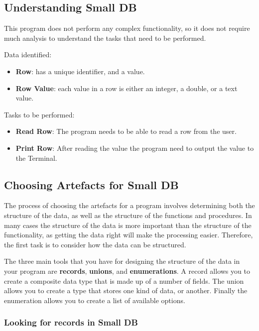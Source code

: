 \subsection{Understanding Small DB} %
\label{sub:understanding_small_db}

This program does not perform any complex functionality, so it does not require much analysis to understand the tasks that need to be performed.

Data identified:
\begin{itemize}
  \item \textbf{Row}: has a unique identifier, and a value.
  \item \textbf{Row Value}: each value in a row is either an integer, a double, or a text value.
\end{itemize}

Tasks to be performed:
\begin{itemize}
  \item \textbf{Read Row}: The program needs to be able to read a row from the user.
  \item \textbf{Print Row}: After reading the value the program need to output the value to the Terminal.
\end{itemize}

\clearpage
\subsection{Choosing Artefacts for Small DB} %
\label{sub:choosing_artefacts_for_small_db}

The process of choosing the artefacts for a program involves determining both the structure of the data, as well as the structure of the functions and procedures. In many cases the structure of the data is more important than the structure of the functionality, as getting the data right will make the processing easier. Therefore, the first task is to consider how the data can be structured.

The three main tools that you have for designing the structure of the data in your program are \textbf{records}, \textbf{unions}, and \textbf{enumerations}. A record allows you to create a composite data type that is made up of a number of fields. The union allows you to create a type that stores one kind of data, or another. Finally the enumeration allows you to create a list of available options.

\subsubsection{Looking for records in Small DB} %
\label{ssub:looking_for_records_in_small_db}

